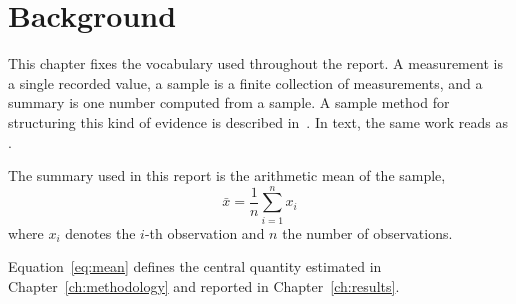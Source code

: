 \chapter{Background}
\label{ch:background}

This chapter fixes the vocabulary used throughout the report. A measurement
is a single recorded value, a sample is a finite collection of measurements,
and a summary is one number computed from a sample. A sample method for
structuring this kind of evidence is described in~\cite{doe2021}.
\ifx\reportbibstyle\apaseven
In text, the same work reads as .
\fi

The summary used in this report is the arithmetic mean of the sample,
\begin{equation}
  \bar{x} = \frac{1}{n} \sum_{i=1}^{n} x_i
  \label{eq:mean}
\end{equation}
where $x_i$ denotes the $i$-th observation and $n$ the number of
observations.

Equation~\eqref{eq:mean} defines the central quantity estimated in
Chapter~\ref{ch:methodology} and reported in Chapter~\ref{ch:results}.
